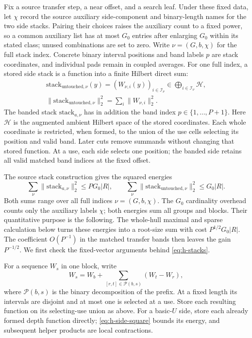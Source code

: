 Fix a source transfer step, a near offset, and a search leaf.
Under these fixed data, let \(\chi\) record the source auxiliary
side-component and binary-length names for the two side stacks.
Pairing their choices raises the auxiliary count to a fixed power,
so a common auxiliary list has at most \(G_0\) entries after enlarging \(G_0\) within
its stated class; unused combinations are set to zero.  Write
\(\nu=(G,b,\chi)\) for the full stack index.  Concrete binary
interval positions and band labels \(p\) are stack coordinates,
and individual pads remain in coupled averages.  For one full
index, a stored side stack is a function into a finite Hilbert
direct sum:
\[
 \begin{gathered}
 \mathrm{stack}_{\mathrm{untouched},\nu}(y)
       =(W_{\nu,i}(y))_{i\in\mathcal I_\nu}
       \in\bigoplus_{i\in\mathcal I_\nu}\mathcal H,\\
 \|\mathrm{stack}_{\mathrm{untouched},\nu}\|_2^2
       =\sum_i\|W_{\nu,i}\|_2^2.
 \end{gathered}
\]
The banded stack \(\mathrm{stack}_{a,\nu}\) has in addition the
band index \(p\in\{1,\ldots,P+1\}\).  Here \(\mathcal H\) is the
augmented ambient Hilbert space of the stored coordinates.  Each
whole coordinate is restricted, when formed, to the union of the
use cells selecting its position and valid band.  Later cuts
remove summands without changing that stored function.  At a use,
each side selects one position; the banded side retains all valid
matched band indices at the fixed offset.

The source stack construction gives the squared energies
\begin{equation}
 \sum_\nu\|\mathrm{stack}_{a,\nu}\|_2^2\le PG_0|R|,
 \qquad
 \sum_\nu\|\mathrm{stack}_{\mathrm{untouched},\nu}\|_2^2\le G_0|R|.
 \label{eq:h-stacks}
\end{equation}
Both sums range over all full indices \(\nu=(G,b,\chi)\).
The \(G_0\) cardinality overhead counts only the auxiliary labels
\(\chi\); both energies sum all groups and blocks.
Their quantitative purpose is the following.  The whole-hull
maximal and sparse calculation below turns these energies into
a root-size sum with cost \(P^{1/2}G_0|R|\).  The coefficient
\(O(P^{-1})\) in the matched transfer bands then leaves the
gain \(P^{-1/2}\).  We first check the fixed-vector arguments
behind \eqref{eq:h-stacks}.

For a sequence \(W_s\) in one block, write
\[
 W_s=W_b+\sum_{[r,t]\in\mathcal P(b,s)}(W_t-W_r),
\]
where \(\mathcal P(b,s)\) is the binary decomposition of the
prefix.  At a fixed length its intervals are disjoint and at
most one is selected at a use.  Store each resulting function
on its selecting-use union as above.  For a basic-\(U\) side,
store each already formed depth function directly;
\eqref{eq:h-side-square} bounds its energy, and subsequent
helper products are local contractions.

